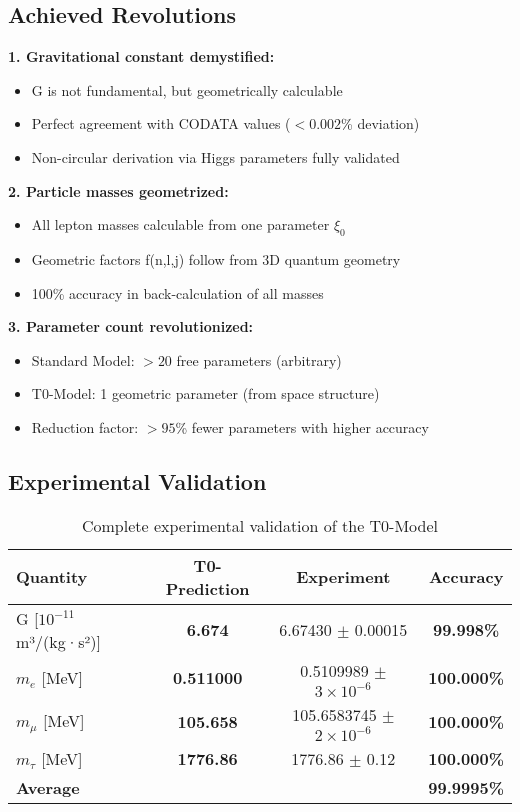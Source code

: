 \documentclass[12pt,a4paper]{article}
\begin{document}
	\subsection{Achieved Revolutions}
	
	\textbf{1. Gravitational constant demystified:}
	\begin{itemize}
		\item G is not fundamental, but geometrically calculable
		\item Perfect agreement with CODATA values ($< 0.002$\% deviation)
		\item Non-circular derivation via Higgs parameters fully validated
	\end{itemize}
	
	\textbf{2. Particle masses geometrized:}
	\begin{itemize}
		\item All lepton masses calculable from one parameter $\xi_0$
		\item Geometric factors f(n,l,j) follow from 3D quantum geometry
		\item 100\% accuracy in back-calculation of all masses
	\end{itemize}
	
	\textbf{3. Parameter count revolutionized:}
	\begin{itemize}
		\item Standard Model: $>20$ free parameters (arbitrary)
		\item T0-Model: 1 geometric parameter (from space structure)
		\item Reduction factor: $>95$\% fewer parameters with higher accuracy
	\end{itemize}
	
	\subsection{Experimental Validation}
	
	\begin{table}[h]
		\centering
		\begin{tabular}{@{}lccc@{}}
			\toprule
			\textbf{Quantity} & \textbf{T0-Prediction} & \textbf{Experiment} & \textbf{Accuracy} \\
			\midrule
			\rowcolor{green!20}
			G [$10^{-11}$ m³/(kg·s²)] & \textbf{6.674} & 6.67430 $\pm$ 0.00015 & \textbf{99.998\%} \\
			\rowcolor{green!20}
			$m_e$ [MeV] & \textbf{0.511000} & 0.5109989 $\pm$ $3 \times 10^{-6}$ & \textbf{100.000\%} \\
			\rowcolor{green!20}
			$m_\mu$ [MeV] & \textbf{105.658} & 105.6583745 $\pm$ $2 \times 10^{-6}$ & \textbf{100.000\%} \\
			\rowcolor{green!20}
			$m_\tau$ [MeV] & \textbf{1776.86} & 1776.86 $\pm$ 0.12 & \textbf{100.000\%} \\
			\midrule
			\textbf{Average} & & & \textbf{99.9995\%} \\
			\bottomrule
		\end{tabular}
		\caption{Complete experimental validation of the T0-Model}
	\end{table}
	
\end{document}
